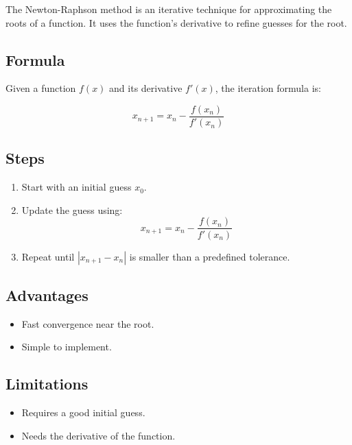 \documentclass{scrreprt}
\begin{document}
The Newton-Raphson method is an iterative technique for approximating the roots of a function. It uses the function's derivative to refine guesses for the root.

\subsection*{Formula}

Given a function \( f(x) \) and its derivative \( f'(x) \), the iteration formula is:

\begin{equation}
x_{n+1} = x_n - \frac{f(x_n)}{f'(x_n)}
\end{equation}

\subsection*{Steps}

\begin{enumerate}
    \item Start with an initial guess \( x_0 \).
    \item Update the guess using:
    \begin{equation}
    x_{n+1} = x_n - \frac{f(x_n)}{f'(x_n)}
    \end{equation}
    \item Repeat until \( |x_{n+1} - x_n| \) is smaller than a predefined tolerance.
\end{enumerate}

\subsection*{Advantages}

\begin{itemize}
    \item Fast convergence near the root.
    \item Simple to implement.
\end{itemize}

\subsection*{Limitations}

\begin{itemize}
    \item Requires a good initial guess.
    \item Needs the derivative of the function.
\end{itemize}
\end{document}
